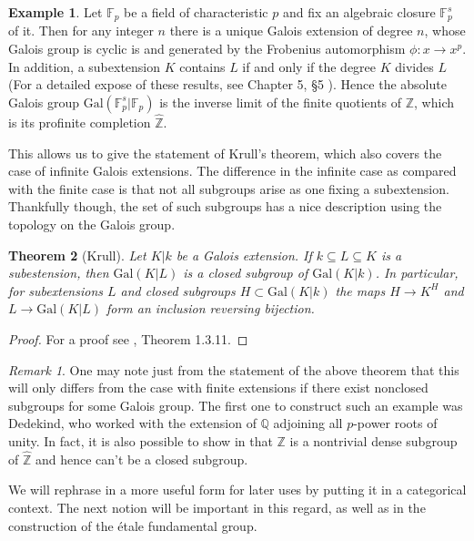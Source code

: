 \documentclass{article}
\newtheorem{theorem}{Theorem}[section]
\theoremstyle{definition}
\newtheorem{example}[theorem]{Example}
\theoremstyle{remark}
\newtheorem*{remark}{Remark}
\theoremstyle{plain}
\newcommand{\Z}{\mathbb{Z}}
\newcommand{\Q}{\mathbb{Q}}
\begin{document}
\begin{example}
	Let $\mathbb{F}_p$ be a field of characteristic $p$ and fix an algebraic closure $\mathbb{F}_p^s$ of it.
	Then for any integer $n$ there is a unique Galois extension of degree $n$, whose Galois group is cyclic is and generated by the Frobenius automorphism $\phi: x \to x^p$.
	In addition, a subextension $K$ contains $L$ if and only if the degree $K$ divides $L$ (For a detailed expose of these results, see Chapter 5, \S 5 \cite{langalgebra}).
	Hence the absolute Galois group $\text{Gal}(\mathbb{F}_p^s| \mathbb{F}_p)$ is the inverse limit of the finite quotients of $\Z$, which is its profinite completion $\widehat{\Z}$.
	

\end{example}
This allows us to give the statement of Krull's theorem, which also covers the case of infinite Galois extensions.
The difference in the infinite case as compared with the finite case is that not all subgroups arise as one fixing a subextension.
Thankfully though, the set of such subgroups has a nice description using the topology on the Galois group.
\begin{theorem}[Krull]
	Let $K | k$ be a Galois extension.
	If $k \subseteq L \subseteq K$ is a subestension, then $\text{Gal}(K|L)$ is a closed subgroup of $\text{Gal}(K|k)$.
	In particular, for subextensions $L$ and closed subgroups $H \subset \text{Gal}(K|k)$ the maps $H \to K^H$ and $L \to \text{Gal}(K|L)$ form an inclusion reversing bijection.
\end{theorem}

\begin{proof}
	For a proof see \cite{Szamuely}, Theorem 1.3.11. 
\end{proof}


\begin{remark}
	One may note just from the statement of the above theorem that this will only differs from the case with finite extensions if there exist nonclosed subgroups for some Galois group.
	The first one to construct such an example was Dedekind, who worked with the extension of $\Q$ adjoining all $p$-power roots of unity.
	In fact, it is also possible to show in   that $\Z$ is a nontrivial dense subgroup of $\widehat{\Z}$ and hence can't be a closed subgroup.
\end{remark}

We will rephrase  in a more useful form for later uses by putting it in a categorical context.
The next notion will be important in this regard, as well as in the construction of the \'etale fundamental group.
\end{document}
